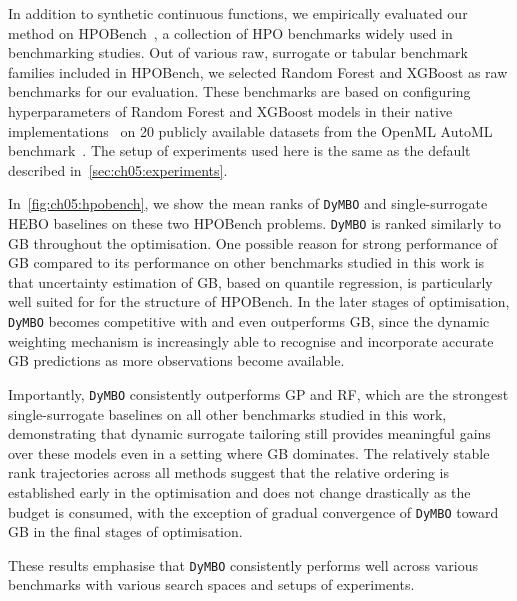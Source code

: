 In addition to synthetic continuous functions, we empirically evaluated our method on HPOBench~\citep{EggEtAl21b}, a collection of HPO benchmarks widely used in benchmarking studies.
Out of various raw, surrogate or tabular benchmark families included in HPOBench, we selected Random Forest and XGBoost as raw benchmarks for our evaluation.
These benchmarks are based on configuring hyperparameters of Random Forest and XGBoost models in their native implementations~\citep{PedEtAl11b,CheGue16} on 20 publicly available datasets from the OpenML AutoML benchmark~\citep{GijEtAl19}.
The setup of experiments used here is the same as the default described in~\cref{sec:ch05:experiments}.

In~\cref{fig:ch05:hpobench}, we show the mean ranks of \texttt{DyMBO} and single-surrogate HEBO baselines on these two HPOBench problems.
\texttt{DyMBO} is ranked similarly to GB throughout the optimisation.
One possible reason for strong performance of GB compared to its performance on other benchmarks studied in this work is that uncertainty estimation of GB, based on quantile regression, is particularly well suited for for the structure of HPOBench.
In the later stages of optimisation, \texttt{DyMBO} becomes competitive with and even outperforms GB, since the dynamic weighting mechanism is increasingly able to recognise and incorporate accurate GB predictions as more observations become available.

Importantly, \texttt{DyMBO} consistently outperforms GP and RF, which are the strongest single-surrogate baselines on all other benchmarks studied in this work, demonstrating that dynamic surrogate tailoring still provides meaningful gains over these models even in a setting where GB dominates.
The relatively stable rank trajectories across all methods suggest that the relative ordering is established early in the optimisation and does not change drastically as the budget is consumed, with the exception of gradual convergence of \texttt{DyMBO} toward GB in the final stages of optimisation.

These results emphasise that \texttt{DyMBO} consistently performs well across various benchmarks with various search spaces and setups of experiments.


